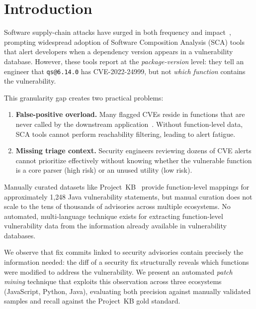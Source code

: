 \documentclass[sigconf,nonacm]{acmart}
\begin{document}

\maketitle

\section{Introduction}
\label{sec:intro}

Software supply-chain attacks have surged in both frequency and 
impact~\cite{ohm2020backstabber,ladisa2023taxonomy}, prompting widespread 
adoption of Software Composition Analysis (SCA) tools that alert developers 
when a dependency version appears in a vulnerability database. However, 
these tools report at the \emph{package-version} level: they tell an 
engineer that \texttt{qs@6.14.0} has CVE-2022-24999, but not 
\emph{which function} contains the vulnerability.

This granularity gap creates two practical problems:

\begin{enumerate}
    \item \textbf{False-positive overload.} Many flagged CVEs reside in 
    functions that are never called by the downstream 
    application~\cite{pashchenko2020qualitative}. Without function-level 
    data, SCA tools cannot perform reachability filtering, leading to alert 
    fatigue.
    \item \textbf{Missing triage context.} Security engineers reviewing 
    dozens of CVE alerts cannot prioritize effectively without knowing 
    whether the vulnerable function is a core parser (high risk) or an 
    unused utility (low risk).
\end{enumerate}

Manually curated datasets like Project~KB~\cite{ponta2019projectkb} provide
function-level mappings for approximately 1{,}248 Java vulnerability
statements, but manual curation does not scale to the tens of thousands of
advisories across multiple ecosystems.
No automated, multi-language technique exists for extracting function-level
vulnerability data from the information already available in vulnerability
databases.

We observe that fix commits linked to security advisories contain precisely
the information needed: the diff of a security fix structurally reveals
which functions were modified to address the vulnerability.
We present an automated \emph{patch mining} technique that exploits this
observation across three ecosystems (JavaScript, Python, Java), evaluating
both precision against manually validated samples and recall against the
Project~KB gold standard.
\end{document}
